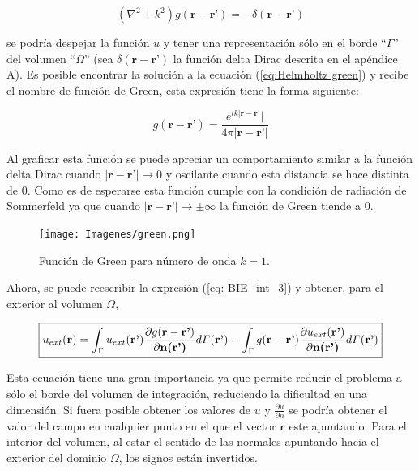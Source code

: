 \documentclass[12pt,letterpaper]{article}
\numberwithin{equation}{section}
\begin{document}
\begin{equation}
	(\nabla^2+k^2)g(\textbf{r}-\textbf{r'})=-\delta(\textbf{r}-\textbf{r'})
	\label{eq:Helmholtz green}
\end{equation}

se podría despejar la función $u$ y tener una representación sólo en el borde ``$\varGamma$'' del volumen ``$\varOmega$'' (sea $\delta(\textbf{r}-\textbf{r'})$ la función delta Dirac descrita en el apéndice A). Es posible encontrar la solución a la ecuación (\ref{eq:Helmholtz green}) y recibe el nombre de función de Green, esta expresión tiene la forma siguiente:

$$g(\textbf{r}-\textbf{r'})=\frac{e^{ik|\textbf{r}-\textbf{r'}}|}{4\pi |\textbf{r}-\textbf{r'}|}$$

Al graficar esta función se puede apreciar un comportamiento similar a la función delta Dirac cuando $|\textbf{r}-\textbf{r'}|\rightarrow0$ y oscilante cuando esta distancia se hace distinta de $0$. Como es de esperarse esta función cumple con la condición de radiación de Sommerfeld ya que cuando $|\textbf{r}-\textbf{r'}|\rightarrow\pm\infty$ la función de Green tiende a $0$.

\begin{figure}[H]
	\centering\texttt{[image: Imagenes/green.png]}\\
	\caption{Función de Green para número de onda $k=1$.}
	\label{fig:Green}
\end{figure} 

\pagebreak
Ahora, se puede reescribir la expresión (\ref{eq: BIE_int_3}) y obtener, para el exterior al volumen $\Omega$,

\begin{equation}
\boxed{
u_{ext}(\textbf{r})=\int_{\Gamma}u_{ext}(\textbf{r'})\frac{\partial g(\textbf{r}-\textbf{r'})}{\partial\textbf{n(\textbf{r'})}}d\varGamma(\textbf{r'}) - \int_{\Gamma}g(\textbf{r}-\textbf{r'})\frac{\partial u_{ext}(\textbf{r'})}{\partial\textbf{n(\textbf{r'})}}d\varGamma(\textbf{r'})
\label{eq: BIE_ext}
}	
\end{equation}

Esta ecuación tiene una gran importancia ya que permite reducir el problema a sólo el borde del volumen de integración, reduciendo la dificultad en una dimensión. Si fuera posible obtener los valores de $u$ y $\frac{\partial u}{\partial n}$ se podría obtener el valor del campo en cualquier punto en el que el vector $\textbf{r}$ este apuntando. Para el interior del volumen, al estar el sentido de las normales apuntando hacia el exterior del dominio $\Omega$, los signos están invertidos.
\end{document}
